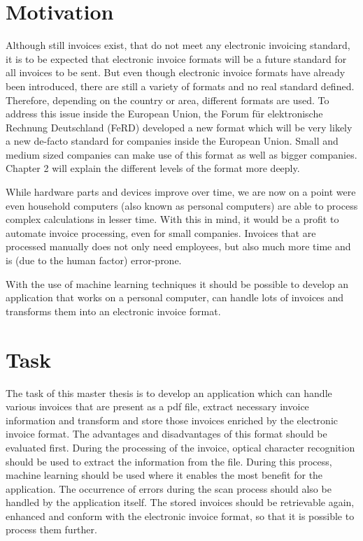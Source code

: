 \section{Motivation}

Although still invoices exist, that do not meet any electronic invoicing standard, it is to be expected that electronic invoice formats will be a future standard for all invoices to be sent. But even though electronic invoice formats have already been introduced, there are still a variety of formats and no real standard defined. Therefore, depending on the country or area, different formats are used. To address this issue inside the European Union, the Forum für elektronische Rechnung Deutschland (FeRD) developed a new format which will be very likely a new de-facto standard for companies inside the European Union. Small and medium sized companies can make use of this format as well as bigger companies. Chapter 2 will explain the different levels of the format more deeply.

While hardware parts and devices improve over time, we are now on a point were even household computers (also known as personal computers) are able to process complex calculations in lesser time. With this in mind, it would be a profit to automate invoice processing, even for small companies. Invoices that are processed manually does not only need employees, but also much more time and is (due to the human factor) error-prone. 

With the use of machine learning techniques it should be possible to develop an application that works on a personal computer, can handle lots of invoices and transforms them into an electronic invoice format.

\section{Task}

The task of this master thesis is to develop an application which can handle various invoices that are present as a pdf file, extract necessary invoice information and transform and store those invoices enriched by the electronic invoice format. The advantages and disadvantages of this format should be evaluated first.
During the processing of the invoice, optical character recognition should be used to extract the information from the file. During this process, machine learning should be used where it enables the most benefit for the application.
The occurrence of errors during the scan process should also be handled by the application itself.
The stored invoices should be retrievable again, enhanced and conform with the electronic invoice format, so that it is possible to process them further.

